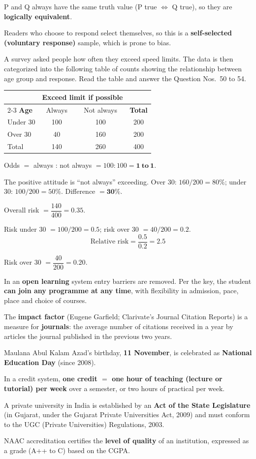 P and Q always have the same truth value (P true $\Leftrightarrow$ Q true), so they are \textbf{logically equivalent}.

Readers who choose to respond select themselves, so this is a \textbf{self-selected (voluntary response)} sample, which is prone to bias.

A survey asked people how often they exceed speed limits. The data is then categorized into the following table of counts showing the relationship between age group and response. Read the table and answer the Question Nos.~50 to 54.
\begin{center}
\begin{tabular}{lccc}\toprule
& \multicolumn{2}{c}{\textbf{Exceed limit if possible}} & \\\cmidrule(lr){2-3}
\textbf{Age} & Always & Not always & \textbf{Total}\\\midrule
Under 30 & 100 & 100 & 200\\ Over 30 & 40 & 160 & 200\\\midrule Total & 140 & 260 & 400\\\bottomrule
\end{tabular}
\end{center}

Odds $=$ always : not always $=100:100=\mathbf{1\ to\ 1}$.

The positive attitude is ``not always'' exceeding. Over 30: $160/200=80\%$; under 30: $100/200=50\%$. Difference $=\mathbf{30\%}$.

Overall risk $=\dfrac{140}{400}=\mathbf{0.35}$.

Risk under 30 $=100/200=0.5$; risk over 30 $=40/200=0.2$.
\[\text{Relative risk}=\frac{0.5}{0.2}=\mathbf{2.5}\]

Risk over 30 $=\dfrac{40}{200}=\mathbf{0.20}$.

In an \textbf{open learning} system entry barriers are removed. Per the key, the student \textbf{can join any programme at any time}, with flexibility in admission, pace, place and choice of courses.

The \textbf{impact factor} (Eugene Garfield; Clarivate's Journal Citation Reports) is a measure for \textbf{journals}: the average number of citations received in a year by articles the journal published in the previous two years.

Maulana Abul Kalam Azad's birthday, \textbf{11 November}, is celebrated as \textbf{National Education Day} (since 2008).

In a credit system, \textbf{one credit $=$ one hour of teaching (lecture or tutorial) per week} over a semester, or two hours of practical per week.

A private university in India is established by an \textbf{Act of the State Legislature} (in Gujarat, under the Gujarat Private Universities Act, 2009) and must conform to the UGC (Private Universities) Regulations, 2003.

NAAC accreditation certifies the \textbf{level of quality} of an institution, expressed as a grade (A++ to C) based on the CGPA.
